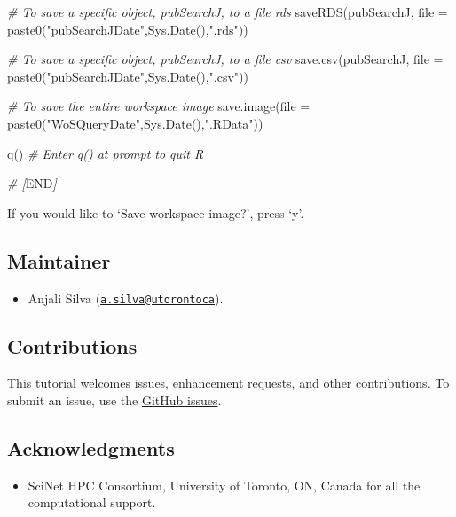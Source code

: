 \documentclass[
]{article}
\newenvironment{Shaded}{\begin{snugshade}}{\end{snugshade}}
\newcommand{\AttributeTok}[1]{\textcolor[rgb]{0.77,0.63,0.00}{#1}}
\newcommand{\CommentTok}[1]{\textcolor[rgb]{0.56,0.35,0.01}{\textit{#1}}}
\newcommand{\FunctionTok}[1]{\textcolor[rgb]{0.00,0.00,0.00}{#1}}
\newcommand{\NormalTok}[1]{#1}
\newcommand{\RegionMarkerTok}[1]{#1}
\newcommand{\StringTok}[1]{\textcolor[rgb]{0.31,0.60,0.02}{#1}}
\providecommand{\tightlist}{%
  \setlength{\itemsep}{0pt}\setlength{\parskip}{0pt}}
\begin{document}
\begin{Shaded}
\begin{Highlighting}[]
\CommentTok{\# To save a specific object, pubSearchJ, to a file rds}
\FunctionTok{saveRDS}\NormalTok{(pubSearchJ, }\AttributeTok{file =} \FunctionTok{paste0}\NormalTok{(}\StringTok{"pubSearchJDate"}\NormalTok{,}\FunctionTok{Sys.Date}\NormalTok{(),}\StringTok{".rds"}\NormalTok{))}

\CommentTok{\# To save a specific object, pubSearchJ, to a file csv}
\FunctionTok{save.csv}\NormalTok{(pubSearchJ, }\AttributeTok{file =} \FunctionTok{paste0}\NormalTok{(}\StringTok{"pubSearchJDate"}\NormalTok{,}\FunctionTok{Sys.Date}\NormalTok{(),}\StringTok{".csv"}\NormalTok{))}

\CommentTok{\# To save the entire workspace image}
\FunctionTok{save.image}\NormalTok{(}\AttributeTok{file =} \FunctionTok{paste0}\NormalTok{(}\StringTok{"WoSQueryDate"}\NormalTok{,}\FunctionTok{Sys.Date}\NormalTok{(),}\StringTok{".RData"}\NormalTok{))}

\FunctionTok{q}\NormalTok{() }\CommentTok{\# Enter q() at prompt to quit R}

\CommentTok{\# [}\RegionMarkerTok{END}\CommentTok{] }
\end{Highlighting}
\end{Shaded}

If you would like to `Save workspace image?', press `y'.

\hypertarget{maintainer}{%
\subsection{Maintainer}\label{maintainer}}

\begin{itemize}
\tightlist
\item
  Anjali Silva
  (\href{mailto:a.silva@utorontoca}{\nolinkurl{a.silva@utorontoca}}).
\end{itemize}

\hypertarget{contributions}{%
\subsection{Contributions}\label{contributions}}

This tutorial welcomes issues, enhancement requests, and other
contributions. To submit an issue, use the
\href{https://github.com/anjalisilva/WebofScienceRTutorial/issues}{GitHub
issues}.

\hypertarget{acknowledgments}{%
\subsection{Acknowledgments}\label{acknowledgments}}

\begin{itemize}
\tightlist
\item
  SciNet HPC Consortium, University of Toronto, ON, Canada for all the
  computational support.
\end{itemize}
\end{document}
